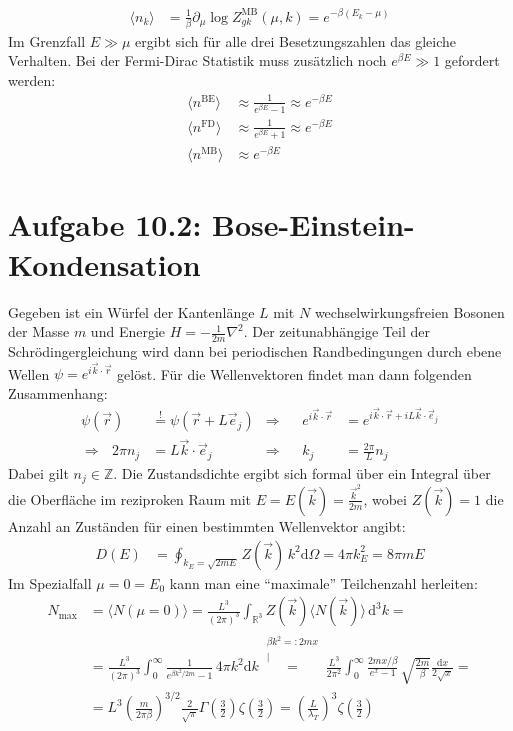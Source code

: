 \documentclass[a4paper,12pt]{article}
\newcommand{\bra}{}
\newcommand{\kom}{}
\newcommand{\intx}{}
\newcommand{\intr}{}
\newcommand{\kla}{}
\newcommand{\tecxt}{}
\begin{document}
\begin{align*}
\bra\langle {n_k}\rangle&=\frac{1}{\beta}\partial_\mu\log Z_{gk}^\tecxt\text{MB}(\mu,k)=e^{-\beta (E_k-\mu)}
\end{align*}
Im Grenzfall $E\gg\mu$ ergibt sich für alle drei Besetzungszahlen das gleiche Verhalten. Bei der Fermi-Dirac Statistik muss zusätzlich noch $e^{\beta E}\gg 1$ gefordert werden:
\begin{align*}
\bra\langle {n^\tecxt\text{BE}}\rangle&\approx\frac{1}{e^{\beta E}-1}\approx e^{-\beta E}\\
\bra\langle {n^\tecxt\text{FD}}\rangle&\approx\frac{1}{e^{\beta E}+1}\approx e^{-\beta E}\\
\bra\langle {n^\tecxt\text{MB}}\rangle&\approx e^{-\beta E}
\end{align*}
\section*{Aufgabe 10.2: Bose-Einstein-Kondensation}
Gegeben ist ein Würfel der Kantenlänge $L$ mit $N$ wechselwirkungsfreien Bosonen der Masse $m$ und Energie $H=-\frac{1}{2m}\nabla^2$. Der zeitunabhängige Teil der Schrödingergleichung wird dann bei periodischen Randbedingungen durch ebene Wellen $\psi =e^{i\vec{k}\cdot\vec{r}}$ gelöst. Für die Wellenvektoren findet man dann folgenden Zusammenhang:
\begin{align*}
\psi (\vec{r})&\overset{!}{=}\psi(\vec{r}+L\vec{e}_j)&\Rightarrow && e^{i\vec{k}\cdot\vec{r}}&=e^{i\vec{k}\cdot\vec{r}+iL\vec{k}\cdot\vec{e}_j}\\
\Rightarrow\ \ \ 2\pi n_j&=L\vec{k}\cdot\vec{e}_j&\Rightarrow &&k_j&=\frac{2\pi}{L}n_j
\end{align*}
Dabei gilt $n_j\in\mathbb{Z}$. Die Zustandsdichte ergibt sich formal über ein Integral über die Oberfläche im reziproken Raum mit $E=E(\vec{k})=\frac{\vec{k}^2}{2m}$, wobei $Z(\vec{k})=1$ die Anzahl an Zuständen für einen bestimmten Wellenvektor angibt:
\begin{align*}
D(E)&=\oint_{k_E=\sqrt{2mE}}Z(\vec{k})\,k^2\tecxt\text{d}\Omega = 4\pi k_E^2=8\pi mE
\end{align*}
Im Spezialfall $\mu=0=E_0$ kann man eine ``maximale'' Teilchenzahl herleiten:
\begin{align*}
N_\tecxt\text{max}&=\bra\langle {N(\mu=0)}\rangle=\frac{L^3}{(2\pi)^3}\intr\int_{\mathbb{R}^{3}}{Z(\vec{k})\bra\langle {N(\vec{k})}\rangle}\,\mathrm{d}^{3}k=\\
&=\frac{L^3}{(2\pi)^3}\intx\int_{0}^{\infty}\frac{1}{e^{\beta k^2/2m}-1}\,4\pi k^2\mathrm{d}k\kom\overset{\substack{{\beta k^2=:2m x} \\ |}}{=}\frac{L^3}{2\pi^2}\intx\int_{0}^{\infty}\frac{2mx/\beta}{e^x-1}\,\sqrt{\frac{2m}{\beta}}\frac{\mathrm{d}x}{2\sqrt{x}}=\\
&=L^3\kla\left( {\frac{m}{2\pi\beta}} \right)^{3/2}\frac{2}{\sqrt{\pi}}\Gamma\kla\left( {\frac{3}{2}} \right)\zeta\kla\left( {\frac{3}{2}} \right)=\kla\left( {\frac{L}{\lambda_T}} \right)^3\zeta\kla\left( {\frac{3}{2}} \right)
\end{align*}
\end{document}
